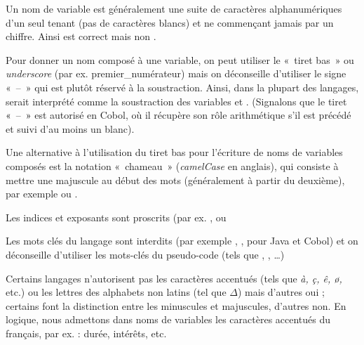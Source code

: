 			\begin{liste}
			\item 
				Un nom de variable est généralement une suite de caractères
				alphanumériques d’un seul tenant (pas de caractères blancs) et ne
				commençant jamais par un chiffre. Ainsi  est
				correct mais non . 
			\item 
				Pour donner un nom composé à une variable, on peut utiliser le «~tiret
				bas~» ou \textit{underscore} (par ex. premier\_numérateur) mais on
				déconseille d’utiliser le signe «~–~» qui est plutôt réservé à la
				soustraction. Ainsi, dans la plupart des langages,
				 serait interprété comme la
				soustraction des variables  et
				. (Signalons que le tiret 
				\textcolor{black}{«~–~»} est autorisé en Cobol, où il récupère son rôle
				arithmétique s’il est précédé et suivi d’au moins un blanc).
			\item 
				Une alternative à l’utilisation du tiret bas pour l’écriture de noms de
				variables composés est la notation «~chameau~» (\textit{camelCase} en
				anglais), qui consiste à mettre une majuscule au début des mots
				(généralement à partir du deuxième), par exemple
				 ou
				.
			\item
				Les indices et exposants sont proscrits (par ex.
				,
				 ou
			\item
				Les mots clés du langage sont interdits (par exemple
				, , 
				pour Java et Cobol) et on déconseille 
				d'utiliser les mots-clés du pseudo-code (tels que
				, 
				, 
				…)
			\item
				Certains langages n’autorisent pas les caractères accentués (tels que
				\textit{à, ç, ê, ø,} etc.) ou les lettres des alphabets non latins
				(tel que ${\Delta}$) mais d’autres oui ; certains font la distinction
				entre les minuscules et majuscules, d’autres non. En logique, nous
				admettons dans noms de variables les caractères accentués du français,
				par ex. : durée, intérêts, etc.
			\end{liste}

